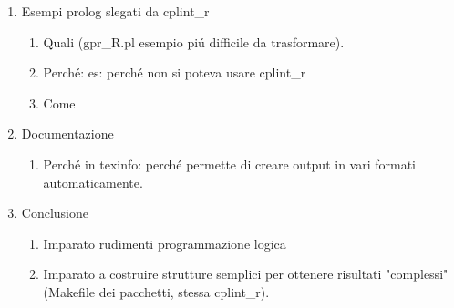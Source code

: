 \documentclass[10pt,titlepage,twoside,a4paper]{report}
\begin{document}
\begin{enumerate}
\begin{enumerate}
        \item Libreria prolog che si interfaccia con R e che consente il plot 
              dei gafici.
        \item Perch\'e ggplot2 (grammar of graphs)
        \item Metodo della libreria: Adattare i predicati della libreria cplint 
              ed adattarli alla nuova situazione, mantenendo i necessari e 
              creandone di nuovi (ovviamente solo quando necessario)
        \item Metodo degli esempi: copia file .pl in \_R.pl, adattamento per 
              usare la libreria, confronto con grafici originali in c3js
        \item <cplint\_r include cplint direttamente perche' in cplint c'\'e la 
              parte dei conti matematici (ancora valida) mentre la parte di plot 
              \'e presente in ogni esempio, quindi i predicati di cplint si 
              possono chiamare direttamente facendo poche modifiche.
        \item Cose degne di nota: Come funziona il passaggio di valori da 
              prolog ad R (e viceversa): speigare gli helpers che ho scritto. 
    \end{enumerate}
    \item Esempi prolog slegati da cplint\_r
    \begin{enumerate}
        \item Quali (gpr\_R.pl esempio pi\'u difficile da trasformare).
        \item Perch\'e: es: perch\'e non si poteva usare cplint\_r
        \item Come
    \end{enumerate}
    \item Documentazione
    \begin{enumerate}
        \item Perch\'e in texinfo: perch\'e permette di creare output in vari 
              formati automaticamente.
    \end{enumerate}
    \item Conclusione
    \begin{enumerate}
        \item Imparato rudimenti programmazione logica
        \item Imparato a costruire strutture semplici per ottenere risultati 
              "complessi" (Makefile dei pacchetti, stessa cplint\_r).
    \end{enumerate}
\end{enumerate}
\end{document}
